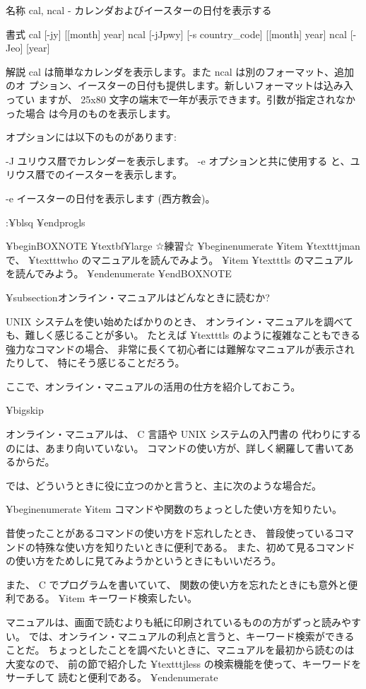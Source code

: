 名称
     cal, ncal - カレンダおよびイースターの日付を表示する

書式
     cal [-jy] [[month] year]
     ncal [-jJpwy] [-s country_code] [[month] year]
     ncal [-Jeo] [year]

解説
     cal は簡単なカレンダを表示します。また ncal は別のフォーマット、追加のオ
     プション、イースターの日付も提供します。新しいフォーマットは込み入ってい
     ますが、 25x80 文字の端末で一年が表示できます。引数が指定されなかった場合
     は今月のものを表示します。

     オプションには以下のものがあります:

     -J      ユリウス暦でカレンダーを表示します。 -e オプションと共に使用する
             と、ユリウス暦でのイースターを表示します。

     -e      イースターの日付を表示します (西方教会)。

:¥blsq
¥end{progls}

¥begin{BOXNOTE}
¥textbf{¥large ☆練習☆}
¥begin{enumerate}
¥item ¥texttt{jman} で、 ¥texttt{who} のマニュアルを読んでみよう。
¥item ¥texttt{ls} のマニュアルを読んでみよう。
¥end{enumerate}
¥end{BOXNOTE}


¥subsection{オンライン・マニュアルはどんなときに読むか?}

UNIX システムを使い始めたばかりのとき、
オンライン・マニュアルを調べても、難しく感じることが多い。
たとえば ¥texttt{ls} のように複雑なこともできる強力なコマンドの場合、
非常に長くて初心者には難解なマニュアルが表示されたりして、
特にそう感じることだろう。

ここで、オンライン・マニュアルの活用の仕方を紹介しておこう。

¥bigskip

オンライン・マニュアルは、 C 言語や UNIX システムの入門書の
代わりにするのには、あまり向いていない。
コマンドの使い方が、詳しく網羅して書いてあるからだ。

では、どういうときに役に立つのかと言うと、主に次のような場合だ。

¥begin{enumerate}
¥item コマンドや関数のちょっとした使い方を知りたい。

昔使ったことがあるコマンドの使い方をド忘れしたとき、
普段使っているコマンドの特殊な使い方を知りたいときに便利である。
また、初めて見るコマンドの使い方をためしに見てみようかというときにもいいだろう。

また、 C でプログラムを書いていて、
関数の使い方を忘れたときにも意外と便利である。
¥item キーワード検索したい。

マニュアルは、画面で読むよりも紙に印刷されているものの方がずっと読みやすい。
では、オンライン・マニュアルの利点と言うと、キーワード検索ができることだ。
ちょっとしたことを調べたいときに、マニュアルを最初から読むのは大変なので、
前の節で紹介した ¥texttt{jless} の検索機能を使って、キーワードをサーチして
読むと便利である。
¥end{enumerate}

